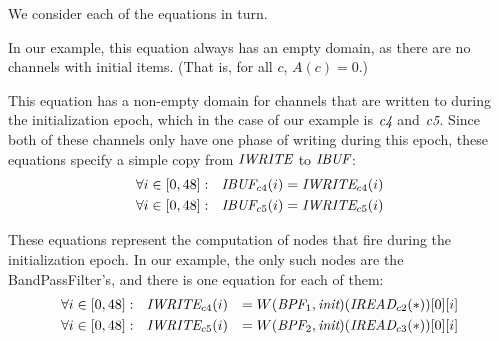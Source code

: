 We consider each of the equations in turn.


In our example, this equation always has an empty domain, as there are
no channels with initial items.  (That is, for all $c$, $A(c) = 0$.)


This equation has a non-empty domain for channels that are written to
during the initialization epoch, which in the case of our example is
$\mbox{\it c4}$ and $\mbox{\it c5}$.  Since both of these channels only have
one phase of writing during this epoch, these equations specify a
simple copy from $\mbox{\it IWRITE}$ to $\mbox{\it IBUF}$:
\begin{align*}
\forall i \in [0, 48]:~~\mbox{\it IBUF}_{c4}(i) &= \mbox{\it IWRITE}_{c4}(i) \\
\forall i \in [0, 48]:~~\mbox{\it IBUF}_{c5}(i) &= \mbox{\it IWRITE}_{c5}(i)
\end{align*}


These equations represent the computation of nodes that fire during
the initialization epoch.  In our example, the only such nodes are the
BandPassFilter's, and there is one equation for each of them:
\begin{align*}
&\forall i \in [0, 48]:~~\mbox{\it IWRITE}_{c4}(i) &= W(\mbox{\it BPF}_1, \mbox{\it init})(\mbox{\it IREAD}_{c2}(*))[0][i] \\
&\forall i \in [0, 48]:~~\mbox{\it IWRITE}_{c5}(i) &= W(\mbox{\it BPF}_2, \mbox{\it init})(\mbox{\it IREAD}_{c3}(*))[0][i]
\end{align*}


